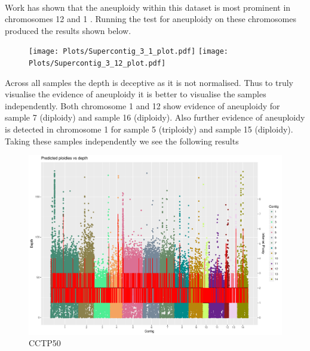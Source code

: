 \documentclass[11pt]{article}
\begin{document}
\paragraph{}Work has shown that the aneuploidy within this dataset is most prominent in chromosomes 12 and 1 \autocite{Rhodes2017}. Running the test for aneuploidy on these chromosomes produced the results shown below. %
\begin{figure}[H]
\begin{center}
\texttt{[image: Plots/Supercontig\_3\_1\_plot.pdf]}
\texttt{[image: Plots/Supercontig\_3\_12\_plot.pdf]}
\end{center}
\end{figure}
Across all samples the depth is deceptive as it is not normalised. Thus to truly visualise the evidence of aneuploidy it is better to visualise the samples independently. Both chromosome 1 and 12 show evidence of aneuploidy for sample 7 (diploidy) and sample 16 (diploidy). Also further evidence of aneuploidy is detected in chromosome 1 for sample 5 (triploidy) and sample 15 (diploidy). Taking these samples independently we see the following results
\begin{figure}[H]
\begin{center}
\caption{CCTP50}
\includegraphics[scale=0.5]{Plots/Sample_7_plot.pdf}
\end{center}
\end{figure}
\end{document}
